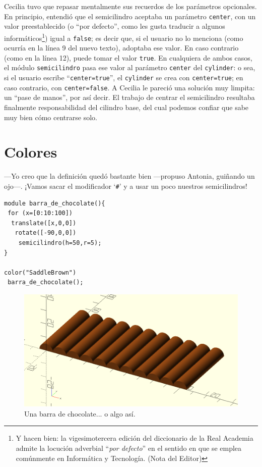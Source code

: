     Cecilia tuvo que repasar mentalmente sus recuerdos de los
    parámetros opcionales. En principio, entendió que el semicilindro
    aceptaba un parámetro \lstinline!center!, con un valor
    preestablecido (o ``por defecto'', como les gusta traducir a
    algunos informáticos\footnote{Y hacen bien: la vigesimotercera
      edición del diccionario de la Real Academia admite la locución
      adverbial ``\emph{por defecto}'' en el sentido en que se emplea
      comúnmente en Informática y Tecnología.  (Nota del Editor)})
    igual a \lstinline!false!; es decir que, si el usuario no lo
    menciona (como ocurría en la línea 9 del nuevo texto), adoptaba
    ese valor. En caso contrario (como en la línea 12), puede tomar el
    valor \lstinline!true!. En cualquiera de ambos casos, el módulo
    \lstinline!semicilindro! pasa ese valor al parámetro
    \lstinline!center! del \lstinline!cylinder!: o sea, si el usuario
    escribe ``\lstinline!center=true!'', el \lstinline!cylinder! se
    crea con \lstinline!center=true!; en caso contrario, con
    \lstinline!center=false!. A Cecilia le pareció una solución muy
    limpita: un ``pase de manos'', por así decir. El trabajo de
    centrar el semicilindro resultaba finalmente responsabilidad del
    cilindro base, del cual podemos confiar que sabe muy bien cómo
    centrarse solo.

\section{Colores}
  
---Yo creo que la definición quedó bastante bien ---pro\-pu\-so Antonia,
guiñando un ojo---. ¡Vamos sacar el modificador `\lstinline!#!' y a
usar un poco nuestros semicilindros!

\begin{lstlisting}
module barra_de_chocolate(){
 for (x=[0:10:100])
  translate([x,0,0])
   rotate([-90,0,0])
    semicilindro(h=50,r=5);
}
  
color("SaddleBrown")  
 barra_de_chocolate();
\end{lstlisting}


\begin{figure}[ht]
  \centering
  \includegraphics[width=.65\textwidth]{imagenes/barra-de-chocolate}  
  \caption{Una barra de chocolate... o algo así.}
  \label{fig:barra-de-chocolate}
\end{figure}

